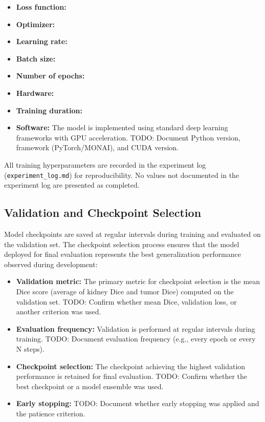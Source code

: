 \begin{itemize}
    \item \textbf{Loss function:} %
    \item \textbf{Optimizer:} %
    \item \textbf{Learning rate:} %
    \item \textbf{Batch size:} %
    \item \textbf{Number of epochs:} %
    \item \textbf{Hardware:} %
    \item \textbf{Training duration:} %
    \item \textbf{Software:} The model is implemented using standard deep learning frameworks with GPU acceleration. TODO: Document Python version, framework (PyTorch/MONAI), and CUDA version.
\end{itemize}

All training hyperparameters are recorded in the experiment log (\texttt{experiment\_log.md}) for reproducibility. No values not documented in the experiment log are presented as completed.

\subsection{Validation and Checkpoint Selection}

Model checkpoints are saved at regular intervals during training and evaluated on the validation set. The checkpoint selection process ensures that the model deployed for final evaluation represents the best generalization performance observed during development:

\begin{itemize}
    \item \textbf{Validation metric:} The primary metric for checkpoint selection is the mean Dice score (average of kidney Dice and tumor Dice) computed on the validation set. TODO: Confirm whether mean Dice, validation loss, or another criterion was used.
    \item \textbf{Evaluation frequency:} Validation is performed at regular intervals during training. TODO: Document evaluation frequency (e.g., every epoch or every N steps).
    \item \textbf{Checkpoint selection:} The checkpoint achieving the highest validation performance is retained for final evaluation. TODO: Confirm whether the best checkpoint or a model ensemble was used.
    \item \textbf{Early stopping:} TODO: Document whether early stopping was applied and the patience criterion.
\end{itemize}

